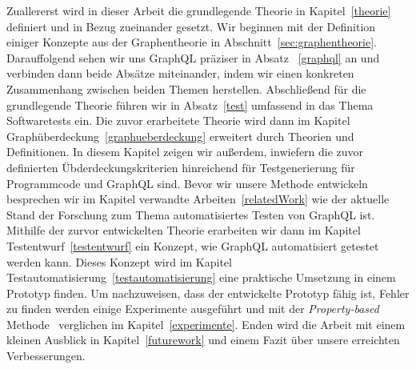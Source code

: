 Zuallererst wird in dieser Arbeit die grundlegende Theorie in Kapitel~\ref{theorie} definiert und in Bezug zueinander gesetzt.
Wir beginnen mit der Definition einiger Konzepte aus der Graphentheorie in Abschnitt~\ref{sec:graphentheorie}.
Darauffolgend sehen wir uns GraphQL präziser in Absatz ~\ref{graphql} an und verbinden dann beide Absätze miteinander, indem wir einen
konkreten Zusammenhang zwischen beiden Themen herstellen.
Abschließend für die grundlegende Theorie führen wir in Absatz~\ref{test} umfassend in das Thema Softwaretests ein.
Die zuvor erarbeitete Theorie wird dann im Kapitel Graphüberdeckung~\ref{graphueberdeckung} erweitert durch Theorien und Definitionen.
In diesem Kapitel zeigen wir außerdem, inwiefern die zuvor definierten Übderdeckungskriterien hinreichend für Testgenerierung für Programmcode und GraphQL sind.
Bevor wir unsere Methode entwickeln besprechen wir im Kapitel verwandte Arbeiten~\ref{relatedWork} wie der aktuelle Stand der Forschung zum Thema
automatisiertes Testen von GraphQL ist.
Mithilfe der zurvor entwickelten Theorie erarbeiten wir dann im Kapitel Testentwurf~\ref{testentwurf} ein Konzept, wie GraphQL automatisiert getestet werden kann.
Dieses Konzept wird im Kapitel Testautomatisierung~\ref{testautomatisierung} eine praktische Umsetzung in einem Prototyp finden.
Um nachzuweisen, dass der entwickelte Prototyp fähig ist, Fehler zu finden werden einige Experimente ausgeführt und mit
der \textit{Property-based} Methode~\cite{property-based-testing} verglichen im Kapitel~\ref{experimente}.
Enden wird die Arbeit mit einem kleinen Ausblick in Kapitel~\ref{futurework} und einem Fazit über unsere erreichten Verbesserungen.
